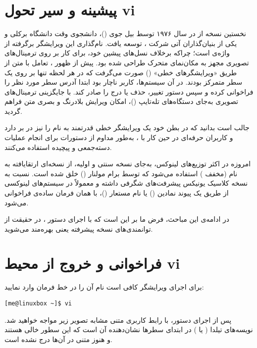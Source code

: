 \section{پیشینه و سیر تحول vi}

نخستین نسخه از  در سال ۱۹۷۶ توسط بیل جوی ()، دانشجوی وقت دانشگاه برکلی و یکی از بنیان‌گذاران آتی شرکت ، توسعه یافت. نام‌گذاری این ویرایشگر برگرفته از واژه‌ی  است؛ چراکه برخلاف نسل‌های پیشین خود، برای کار بر روی ترمینال‌های تصویری مجهز به مکان‌نمای متحرک طراحی شده بود. پیش از ظهور ، تعامل با متن از طریق «ویرایشگرهای خطی» () صورت می‌گرفت که در هر لحظه تنها بر روی یک سطر متمرکز بودند. در آن سیستم‌ها، کاربر ناچار بود ابتدا آدرس سطر مورد نظر را فراخوانی کرده و سپس دستور تغییر، حذف یا درج را صادر کند. با جایگزینی ترمینال‌های تصویری به‌جای دستگاه‌های تله‌تایپ ()، امکان ویرایش بلادرنگ و بصری متن فراهم گردید.

جالب است بدانید که  در بطن خود یک ویرایشگر خطی قدرتمند به نام  را نیز در بر دارد و کاربران حرفه‌ای در حین کار با ، به‌طور مداوم از دستورات  برای انجام عملیات دسته‌جمعی و پیچیده استفاده می‌کنند.

امروزه در اکثر توزیع‌های لینوکس، به‌جای نسخه سنتی و اولیه، از نسخه‌ای ارتقایافته به نام  (مخفف ) استفاده می‌شود که توسط برام مولنار () خلق شده است.  نسبت به نسخه کلاسیک یونیکس پیشرفت‌های شگرفی داشته و معمولاً در سیستم‌های لینوکسی از طریق یک پیوند نمادین () یا نام مستعار ()، با همان فرمان ساده‌ی  فراخوانی می‌شود.

در ادامه‌ی این مباحث، فرض ما بر این است که با اجرای دستور ، در حقیقت از توانمندی‌های نسخه پیشرفته یعنی  بهره‌مند می‌شوید.

\section{فراخوانی و خروج از محیط vi}

برای اجرای ویرایشگر  کافی است نام آن را در خط فرمان وارد نمایید:

\begin{latin}
\begin{lstlisting}
[me@linuxbox ~]$ vi
\end{lstlisting}
\end{latin}

پس از اجرای دستور، با رابط کاربری متنی مشابه تصویر زیر مواجه خواهید شد. نویسه‌های تیلدا ( یا \cmd{\textasciitilde}) در ابتدای سطرها نشان‌دهنده آن است که این سطور خالی هستند و هنوز متنی در آن‌ها درج نشده است.

